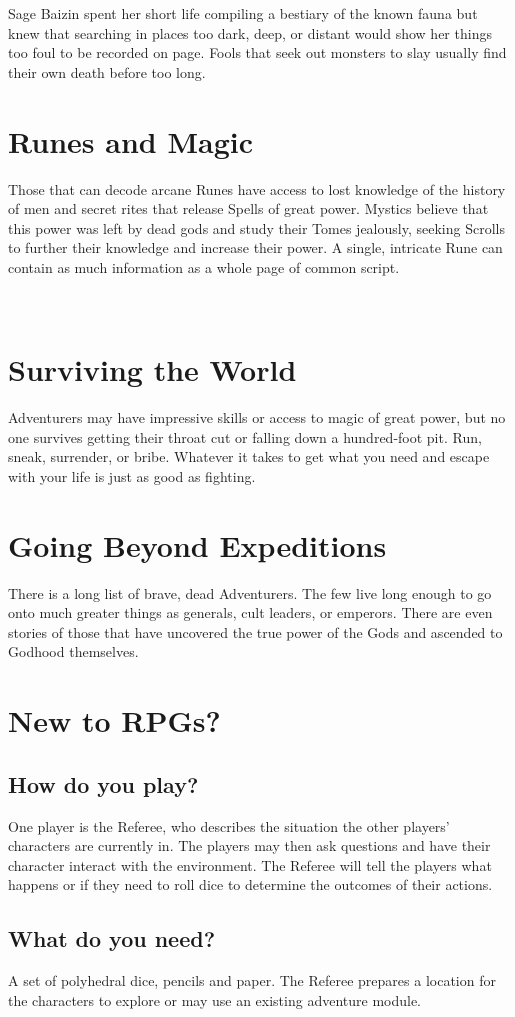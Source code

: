 \documentclass[itdr/core]{subfiles}
\begin{document}
Sage Baizin spent her short life compiling a bestiary of the known fauna but knew that searching in places too dark, deep, or distant would show her things too foul to be recorded on page. Fools that seek out monsters to slay usually find their own death before too long.

\section*{Runes and Magic}

Those that can decode arcane Runes have access to lost knowledge of the history of men and secret rites that release Spells of great power. Mystics believe that this power was left by dead gods and study their Tomes jealously, seeking Scrolls to further their knowledge and increase their power. A single, intricate Rune can contain as much information as a whole page of common script.

\vfill
\break

~\vspace{-17.5pt}
\section*{Surviving the World}

Adventurers may have impressive skills or access to magic of great power, but no one survives getting their throat cut or falling down a hundred-foot pit. Run, sneak, surrender, or bribe. Whatever it takes to get what you need and escape with your life is just as good as fighting.

\section*{Going Beyond Expeditions}

There is a long list of brave, dead Adventurers. The few live long enough to go onto much greater things as generals, cult leaders, or emperors. There are even stories of those that have uncovered the true power of the Gods and ascended to Godhood themselves.

\vspace{3.5pt}

\section*{New to RPGs?}

\subsection*{How do you play?}
One player is the Referee, who describes the situation the other players' characters are currently in. The players may then ask questions and have their character interact with the environment. The Referee will tell the players what happens or if they need to roll dice to determine the outcomes of their actions.

\subsection*{What do you need?}
A set of polyhedral dice, pencils and paper. The Referee prepares a location for the characters to explore or may use an existing adventure module.
\end{document}
